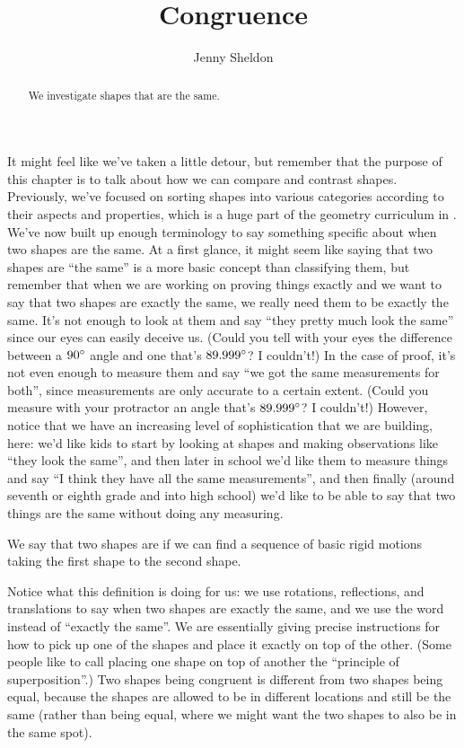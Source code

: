 \documentclass{ximera}
\title{Congruence}
\author{Jenny Sheldon}
\begin{document}
\begin{abstract}
We investigate shapes that are the same.
\end{abstract}
\maketitle

It might feel like we've taken a little detour, but remember that the purpose of this chapter is to talk about how we can compare and contrast shapes. Previously, we've focused on sorting shapes into various categories according to their aspects and properties, which is a huge part of the geometry curriculum in .  We've now built up enough terminology to say something specific about when two shapes are the same. At a first glance, it might seem like saying that two shapes are ``the same'' is a more basic concept than classifying them, but remember that when we are working on proving things exactly and we want to say that two shapes are exactly the same, we really need them to be exactly the same. It's not enough to look at them and say ``they pretty much look the same'' since our eyes can easily deceive us. (Could you tell with your eyes the difference between a $90\degree$ angle and one that's $89.999\degree$? I couldn't!) In the case of proof, it's not even enough to measure them and say ``we got the same measurements for both'', since measurements are only accurate to a certain extent. (Could you measure with your protractor an angle that's $89.999\degree$? I couldn't!) However, notice that we have an increasing level of sophistication that we are building, here: we'd like kids to start by looking at shapes and making observations like ``they look the same'', and then later in school we'd like them to measure things and say ``I think they have all the same measurements'', and then finally (around seventh or eighth grade and into high school) we'd like to be able to say that two things are the same without doing any measuring. 

\begin{definition}
We say that two shapes are  if we can find a sequence of basic rigid motions taking the first shape to the second shape.
\end{definition}
Notice what this definition is doing for us: we use rotations, reflections, and translations to say when two shapes are exactly the same, and we use the word  instead of ``exactly the same''. We are essentially giving precise instructions for how to pick up one of the shapes and place it exactly on top of the other. (Some people like to call placing one shape on top of another the ``principle of superposition''.) Two shapes being congruent is different from two shapes being equal, because the shapes are allowed to be in different locations and still be the same (rather than being equal, where we might want the two shapes to also be in the same spot).
\end{document}
